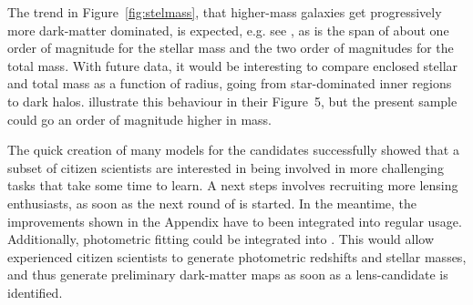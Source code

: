 The trend in Figure~\ref{fig:stelmass}, that higher-mass galaxies get
progressively more dark-matter dominated, is expected,
e.g. see \cite{2005ApJ...623L...5F}, as is the span of about one order
of magnitude for the stellar mass and the two order of magnitudes for the total
mass.
With future data, it would be interesting to compare enclosed
stellar and total mass as a function of radius, going from
star-dominated inner regions to dark halos.
\cite{2011ApJ...740...97L} illustrate this behaviour in their
Figure~5, but the present sample could go an order of magnitude higher
in mass.

The quick creation of many models for the {\SW} candidates successfully showed
that a subset of citizen scientists are interested in being involved in more
challenging tasks that take some time to learn. A next steps involves
recruiting more lensing enthusiasts, as soon as the next round of {\SW} is
started.
In the meantime, the improvements shown in the Appendix have to been integrated
into regular {\SpL} usage.
Additionally, photometric fitting could be integrated into {\SpL}.
This would allow experienced citizen scientists to generate photometric
redshifts and stellar masses, and thus generate preliminary dark-matter maps
as soon as a lens-candidate is identified.


